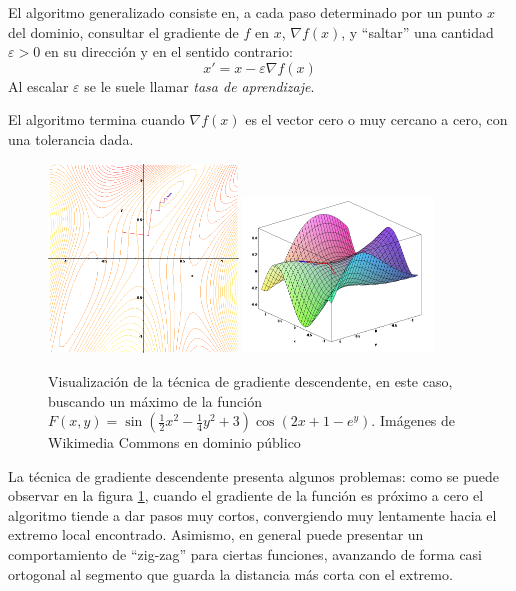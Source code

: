 El algoritmo generalizado consiste en, a cada paso determinado por un
punto \(x\) del dominio, consultar el gradiente de \(f\) en \(x\),
\(\nabla f(x)\), y ``saltar'' una cantidad \(\varepsilon>0\) en su
dirección y en el sentido contrario: \[x' = x - \varepsilon\nabla f(x)\]
Al escalar \(\varepsilon\) se le suele llamar \emph{tasa de
aprendizaje}.

El algoritmo termina cuando \(\nabla f(x)\) es el vector cero o muy
cercano a cero, con una tolerancia dada.

\begin{figure}[hbtp]
  \centering
  \includegraphics[width=0.45\textwidth]{images/gradient_ascent_contour.png}
  \includegraphics[width=0.45\textwidth]{images/gradient_ascent_surface.png}
  \caption{\label{fig:grad-desc}Visualización de la técnica de gradiente descendente, en este caso, buscando un máximo de la función $F(x,y)=\sin\left(\frac{1}{2} x^2 - \frac{1}{4} y^2 + 3 \right) \cos(2 x+1-e^y)$. Imágenes de Wikimedia Commons en dominio público}
\end{figure}

La técnica de gradiente descendente presenta algunos problemas: como se
puede observar en la figura \ref{fig:grad-desc}, cuando el gradiente de
la función es próximo a cero el algoritmo tiende a dar pasos muy cortos,
convergiendo muy lentamente hacia el extremo local encontrado. Asimismo,
en general puede presentar un comportamiento de ``zig-zag'' para ciertas
funciones, avanzando de forma casi ortogonal al segmento que guarda la
distancia más corta con el extremo.
